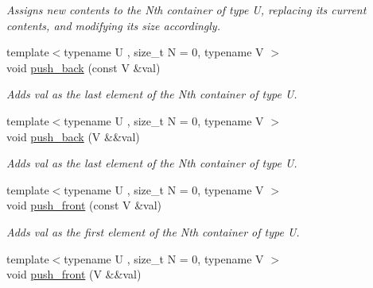 \begin{DoxyCompactItemize}
\begin{DoxyCompactList}\small\item\em Assigns new contents to the Nth container of type U, replacing its current contents, and modifying its size accordingly. \end{DoxyCompactList}\item 
\hypertarget{classheterogeneous_1_1heterolist_3_01_t_00_01_types_8_8_8_4_a2ab6beda0e7381e23b17f73f431c0a0b}{}{\footnotesize template$<$typename U , size\+\_\+t N = 0, typename V $>$ }\\void \hyperlink{classheterogeneous_1_1heterolist_3_01_t_00_01_types_8_8_8_4_a2ab6beda0e7381e23b17f73f431c0a0b}{push\+\_\+back} (const V \&val)\label{classheterogeneous_1_1heterolist_3_01_t_00_01_types_8_8_8_4_a2ab6beda0e7381e23b17f73f431c0a0b}

\begin{DoxyCompactList}\small\item\em Adds val as the last element of the Nth container of type U. \end{DoxyCompactList}\item 
\hypertarget{classheterogeneous_1_1heterolist_3_01_t_00_01_types_8_8_8_4_aa9655a46f94e06364455835142a41e58}{}{\footnotesize template$<$typename U , size\+\_\+t N = 0, typename V $>$ }\\void \hyperlink{classheterogeneous_1_1heterolist_3_01_t_00_01_types_8_8_8_4_aa9655a46f94e06364455835142a41e58}{push\+\_\+back} (V \&\&val)\label{classheterogeneous_1_1heterolist_3_01_t_00_01_types_8_8_8_4_aa9655a46f94e06364455835142a41e58}

\begin{DoxyCompactList}\small\item\em Adds val as the last element of the Nth container of type U. \end{DoxyCompactList}\item 
\hypertarget{classheterogeneous_1_1heterolist_3_01_t_00_01_types_8_8_8_4_a183337537179e281867b47d13acebada}{}{\footnotesize template$<$typename U , size\+\_\+t N = 0, typename V $>$ }\\void \hyperlink{classheterogeneous_1_1heterolist_3_01_t_00_01_types_8_8_8_4_a183337537179e281867b47d13acebada}{push\+\_\+front} (const V \&val)\label{classheterogeneous_1_1heterolist_3_01_t_00_01_types_8_8_8_4_a183337537179e281867b47d13acebada}

\begin{DoxyCompactList}\small\item\em Adds val as the first element of the Nth container of type U. \end{DoxyCompactList}\item 
\hypertarget{classheterogeneous_1_1heterolist_3_01_t_00_01_types_8_8_8_4_ae7dc4161bfe352cd72b22877ce77a135}{}{\footnotesize template$<$typename U , size\+\_\+t N = 0, typename V $>$ }\\void \hyperlink{classheterogeneous_1_1heterolist_3_01_t_00_01_types_8_8_8_4_ae7dc4161bfe352cd72b22877ce77a135}{push\+\_\+front} (V \&\&val)\label{classheterogeneous_1_1heterolist_3_01_t_00_01_types_8_8_8_4_ae7dc4161bfe352cd72b22877ce77a135}


\end{DoxyCompactItemize}
